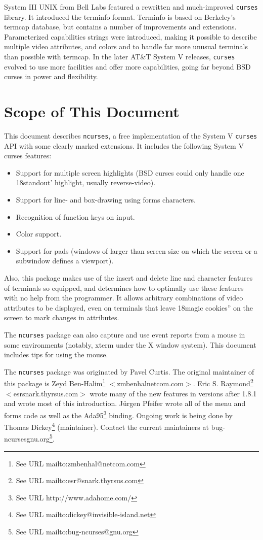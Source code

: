 System III UNIX from Bell Labs featured a rewritten and much-improved
\texttt{curses} library.  It introduced the terminfo format.  Terminfo is based
on Berkeley's termcap database, but contains a number of improvements and
extensions. Parameterized capabilities strings were introduced, making it
possible to describe multiple video attributes, and colors and to handle far
more unusual terminals than possible with termcap.  In the later AT\&T
System V releases, \texttt{curses} evolved to use more facilities and offer
more capabilities, going far beyond BSD curses in power and flexibility.

\section{Scope of This Document}

\label{f0:scope}This document describes \texttt{ncurses}, a free implementation of
the System V \texttt{curses} API with some clearly marked extensions.
It includes the following System V curses features:
\begin{itemize}
\item Support for multiple screen highlights (BSD curses could only
handle one \char18standout' highlight, usually reverse-video).
\item Support for line- and box-drawing using forms characters.
\item Recognition of function keys on input.
\item Color support.
\item Support for pads (windows of larger than screen size on which the
screen or a subwindow defines a viewport).
\end{itemize}
Also, this package makes use of the insert and delete line and character
features of terminals so equipped, and determines how to optimally use these
features with no help from the programmer.  It allows arbitrary combinations of
video attributes to be displayed, even on terminals that leave \char18magic
cookies'' on the screen to mark changes in attributes. 

The \texttt{ncurses} package can also capture and use event reports from a
mouse in some environments (notably, xterm under the X window system).  This
document includes tips for using the mouse. 

The \texttt{ncurses} package was originated by Pavel Curtis.  The original
maintainer of this package is
Zeyd Ben-Halim\footnote{See URL mailto:zmbenhal@netcom.com}
\mbox{$<$}zmbenhal{}netcom.com\mbox{$>$}.
Eric S. Raymond\footnote{See URL mailto:esr@snark.thyrsus.com}
\mbox{$<$}esr{}snark.thyrsus.com\mbox{$>$}
wrote many of the new features in versions after 1.8.1
and wrote most of this introduction.
J\"urgen Pfeifer
wrote all of the menu and forms code as well as the
Ada95\footnote{See URL http://www.adahome.com/} binding.
Ongoing work is being done by
Thomas Dickey\footnote{See URL mailto:dickey@invisible-island.net} (maintainer).
Contact the current maintainers at
bug-ncurses{}gnu.org\footnote{See URL mailto:bug-ncurses@gnu.org}.

